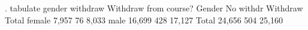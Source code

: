 . tabulate gender withdraw
{\smallskip}
           {\VBAR} Withdraw from course?
    Gender {\VBAR} No withdr   Withdraw {\VBAR}     Total
    female {\VBAR}     7,957         76 {\VBAR}     8,033 
      male {\VBAR}    16,699        428 {\VBAR}    17,127 
     Total {\VBAR}    24,656        504 {\VBAR}    25,160 
{\smallskip}
